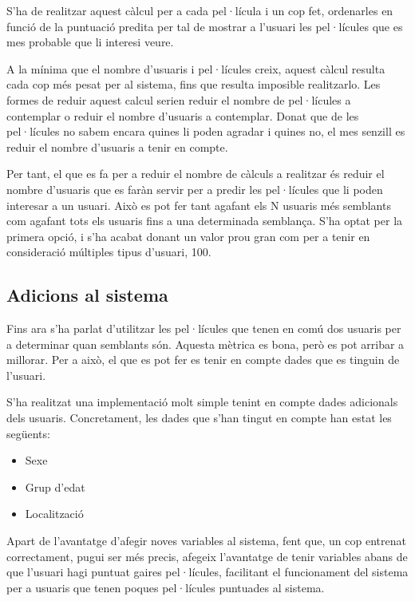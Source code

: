 S'ha de realitzar aquest càlcul per a cada pel·lícula i un cop fet, ordenarles en funció de la puntuació predita per tal de mostrar a l'usuari les pel·lícules que es mes probable que li interesi veure.

A la mínima que el nombre d'usuaris i pel·lícules creix, aquest càlcul resulta cada cop més pesat per al sistema, fins que resulta imposible realitzarlo. Les formes de reduir aquest calcul serien reduir el nombre de pel·lícules a contemplar o reduir el nombre d'usuaris a contemplar. Donat que de les pel·lícules no sabem encara quines li poden agradar i quines no, el mes senzill es reduir el nombre d'usuaris a tenir en compte.

Per tant, el que es fa per a reduir el nombre de càlculs a realitzar és reduir el nombre d'usuaris que es faràn servir per a predir les pel·lícules que li poden interesar a un usuari. Això es pot fer tant agafant els N usuaris més semblants com agafant tots els usuaris fins a una determinada semblança. S'ha optat per la primera opció, i s'ha acabat donant un valor prou gran com per a tenir en consideració múltiples tipus d'usuari, 100.

\subsection{Adicions al sistema}

Fins ara s'ha parlat d'utilitzar les pel·lícules que tenen en comú dos usuaris per a determinar quan semblants són. Aquesta mètrica es bona, però es pot arribar a millorar. Per a això, el que es pot fer es tenir en compte dades que es tinguin de l'usuari.

S'ha realitzat una implementació molt simple tenint en compte dades adicionals dels usuaris. Concretament, les dades que s'han tingut en compte han estat les següents:

\begin{itemize}
	\item Sexe
	\item Grup d'edat
	\item Localització
\end{itemize}

Apart de l'avantatge d'afegir noves variables al sistema, fent que, un cop entrenat correctament, pugui ser més precis, afegeix l'avantatge de tenir variables abans de que l'usuari hagi puntuat gaires pel·lícules, facilitant el funcionament del sistema per a usuaris que tenen poques pel·lícules puntuades al sistema.

